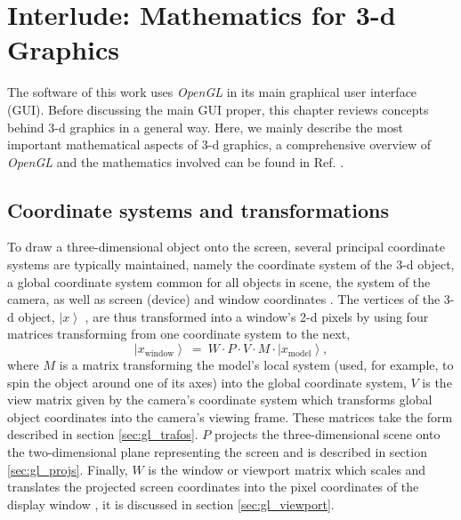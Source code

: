 %
%

\chapter{Interlude: Mathematics for 3-d Graphics}
\label{ch:gl}

The software of this work uses \textit{OpenGL} \cite{web_OpenGL} in its main graphical user interface (GUI).
Before discussing the main GUI proper, this chapter reviews concepts behind 3-d graphics in a general way.
Here, we mainly describe the most important mathematical aspects of 3-d graphics, a comprehensive overview of 
\textit{OpenGL} and the mathematics involved can be found in Ref. \cite{Sellers2002}.



\section{Coordinate systems and transformations}
To draw a three-dimensional object onto the screen, several principal coordinate systems are typically maintained,
namely the coordinate system of the 3-d object, a global coordinate system common for all objects in scene, the
system of the camera, as well as screen (device) and window coordinates \cite[pp. 63-66]{Sellers2002}.
The vertices of the 3-d object, $\left|x\right>$ , are thus transformed into a window's 2-d pixels by using four
matrices transforming from one coordinate system to the next,
\begin{equation}
	\boxed{\left|x_{\mathrm{window}}\right> \ =\ W \cdot P \cdot V \cdot  M \cdot  \left| x_{\mathrm{model}} \right>,}
	\label{eq:gl_mvp}
\end{equation}
where $M$ is a matrix transforming the model's local system (used, for example, to spin the object around one of
its axes) into the global coordinate system, $V$ is the view matrix given by the camera's coordinate system
which transforms global object coordinates into the camera's viewing frame. These matrices take the form
described in section \ref{sec:gl_trafos}.
$P$ projects the three-dimensional scene onto the two-dimensional plane representing the screen \cite{web_gl_ortho, web_gl_perspective} and is described in section \ref{sec:gl_projs}. 
Finally, $W$ is the window or viewport matrix which scales and translates the projected screen coordinates 
into the pixel coordinates of the display window \cite{web_gl_viewport}, it is discussed in section \ref{sec:gl_viewport}.


